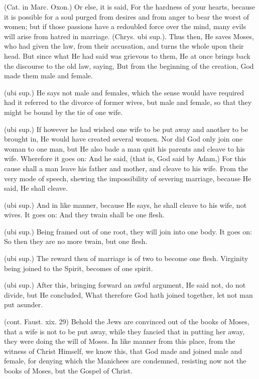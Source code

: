  (Cat. in Marc. Oxon.) Or else, it is said, For the hardness of your hearts, because it is possible for a soul purged from desires and from anger to bear the worst of women; but if those passions have a redoubled force over the mind, many evils will arise from hatred in marriage. (Chrys. ubi sup.). Thus then, He saves Moses, who had given the law, from their accusation, and turns the whole upon their head. But since what He had said was grievous to them, He at once brings back the discourse to the old law, saying, But from the beginning of the creation, God made them male and female.

 (ubi sup.) He says not male and females, which the sense would have required had it referred to the divorce of former wives, but male and female, so that they might be bound by the tie of one wife.

 (ubi sup.) If however he had wished one wife to be put away and another to be brought in, He would have created several women. Nor did God only join one woman to one man, but He also bade a man quit his parents and cleave to his wife. Wherefore it goes on: And he said, (that is, God said by Adam,) For this cause shall a man leave his father and mother, and cleave to his wife. From the very mode of speech, shewing the impossibility of severing marriage, because He said, He shall cleave.

 (ubi sup.) And in like manner, because He says, he shall cleave to his wife, not wives. It goes on: And they twain shall be one flesh.

 (ubi sup.) Being framed out of one root, they will join into one body. It goes on: So then they are no more twain, but one flesh.

 (ubi sup.) The reward then of marriage is of two to become one flesh. Virginity being joined to the Spirit, becomes of one spirit.

 (ubi sup.) After this, bringing forward an awful argument, He said not, do not divide, but He concluded, What therefore God hath joined together, let not man put asunder.

 (cont. Faust. xix. 29) Behold the Jews are convinced out of the books of Moses, that a wife is not to be put away, while they fancied that in putting her away, they were doing the will of Moses. In like manner from this place, from the witness of Christ Himself, we know this, that God made and joined male and female, for denying which the Manichees are condemned, resisting now not the books of Moses, but the Gospel of Christ.

